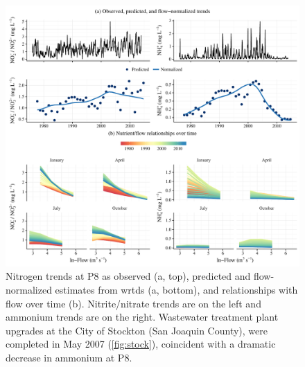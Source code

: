 \documentclass[letterpaper,12pt,oneside]{article}\usepackage[]{graphicx}\usepackage[]{color}
\begin{document}
\begin{figure}[!ht]

{\centering \includegraphics[width=\textwidth]{figs/p8trnds-1} 

}

\caption{Nitrogen trends at P8 as observed (a, top), predicted and flow-normalized estimates from \ac{wrtds} (a, bottom), and relationships with flow over time (b).  Nitrite/nitrate trends are on the left and ammonium trends are on the right.  Wastewater treatment plant upgrades at the City of Stockton (San Joaquin County), were completed in May 2007 (\cref{fig:stock}), coincident with a dramatic decrease in ammonium at P8.}\label{fig:p8trnds}
\end{figure}
\end{document}
